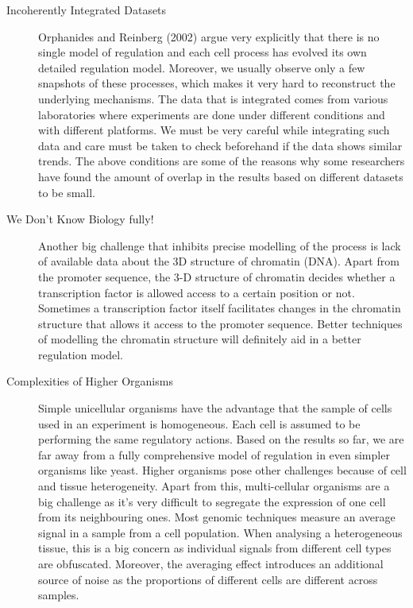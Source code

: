 \begin{description}
\item[Incoherently Integrated Datasets] Orphanides and Reinberg (2002) argue very explicitly that there is no single model of regulation and each cell process has evolved its own detailed regulation model. Moreover, we usually observe only a few snapshots of these processes, which makes it very hard to reconstruct the underlying mechanisms. The data that is integrated comes from various laboratories where experiments are done under different conditions and with different platforms. We must be very careful while integrating such data and care must be taken to check beforehand if the data shows similar trends. The above conditions are some of the reasons why some researchers \citep{dolinski2005changing} have found the amount of overlap in the results based on different datasets to be small. 
 
\item[We Don't Know Biology fully!] Another big challenge that inhibits precise modelling of the process is lack of available data about the 3D structure of chromatin (DNA). Apart from the promoter sequence, the 3-D structure of chromatin decides whether a transcription factor is allowed access to a certain position or not. Sometimes a transcription factor itself facilitates changes in the chromatin structure that allows it access to the promoter sequence. Better techniques of modelling the chromatin structure will definitely aid in a better regulation model.

\item[Complexities of Higher Organisms] Simple unicellular organisms have the advantage that the sample of cells used in an experiment is homogeneous. Each cell is assumed to be performing the same regulatory actions. Based on the results so far, we are far away from a fully comprehensive model of regulation in even simpler organisms like yeast. Higher organisms pose other challenges because of cell and tissue heterogeneity. Apart from this, multi-cellular organisms are a big challenge as it's very difficult to segregate the expression of one cell from its neighbouring ones. Most genomic techniques measure an average signal in a sample from a cell population. When analysing a heterogeneous tissue, this is a big concern as individual signals from different cell types are obfuscated. Moreover, the averaging effect introduces an additional source of noise as the proportions of different cells are different across samples. 


\end{description}
